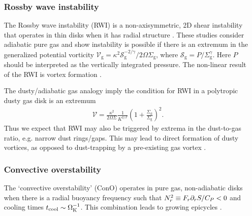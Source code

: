 \subsubsection{Rossby wave instability}
The Rossby wave instability (RWI) is a non-axisymmetric, 2D shear
instability that operates in thin disks when it has radial structure
\citep{lovelace99,li00}. These studies consider adiabatic pure gas and 
show instability is possible if there is an extremum in the generalized
potential vorticity 
 $\mathcal{V}_\mathrm{g} =
 \kappa^2\mathcal{S}_\mathrm{g}^{-2/\gamma}/2\Omega\Sigma_\mathrm{g}$, 
where $\mathcal{S}_\mathrm{g} = P/\Sigma_\mathrm{g}^\gamma$. Here $P$
should be interpreted as the vertically integrated pressure. The
non-linear result of the RWI is vortex formation \citep{li01}. 

The dusty/adiabatic gas analogy imply the condition for RWI in a
polytropic dusty gas disk is an extremum   
\begin{align}
  \mathcal{V} =
  \frac{\kappa^2}{2\Omega\Sigma}\frac{1}{K^{2/\Gamma}}\left(1+
    \frac{\Sigma_\mathrm{d}}{\Sigma_\mathrm{g}}\right)^2.    
\end{align}
Thus we expect that RWI may also be triggered by extrema 
in the dust-to-gas ratio, e.g. narrow dust rings/gaps. This may lead
to direct formation of dusty vortices, as opposed to dust-trapping by  
a pre-existing gas vortex \citep{barge95,lyra13}.  



\subsubsection{Convective overstability}
The `convective overstability' (ConO) operates in pure gas, non-adiabatic disks 
when there is a radial buoyancy frequency such that $N_r^2\equiv
F_r\partial_rS/C_P  < 0 $ and cooling times $t_\mathrm{cool}\sim \Omega_{\rm K}^{-1}$. This
combination leads to growing epicycles
\citep{klahr14,lyra14,latter16}.     

